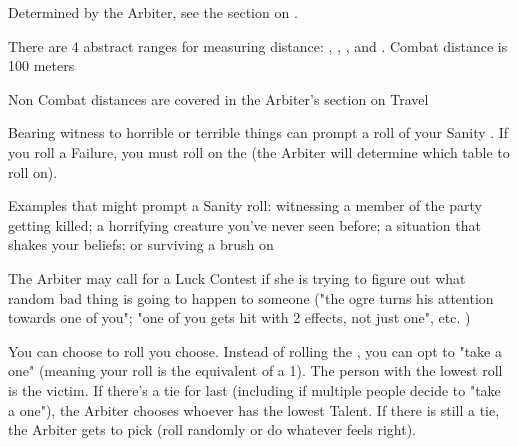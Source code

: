 {
Determined by the Arbiter, see the section on .

\cbreak


There are 4 abstract ranges for measuring distance:  , , , and  .  \MAX Combat distance is 100 meters




Non Combat distances are covered in the Arbiter's section on Travel





Bearing witness to horrible or terrible things can prompt a roll of your Sanity \UD.  If you roll a Failure, you must roll on the  (the Arbiter will determine which table to roll on). 

Examples that might prompt a Sanity roll:  witnessing a member of the party getting killed; a horrifying creature you've never seen before; a situation that shakes your beliefs; or surviving a brush on 



The Arbiter may call for a Luck Contest if she is trying to figure out what random bad thing is going to happen to someone ("the ogre turns his attention towards one of you"; "one of you gets hit with 2 effects, not just one", etc. )

You can choose to roll   \UD you choose.  Instead of rolling the \UD, you can opt to "take a one" (meaning your roll is the equivalent of a 1).  The person with the lowest roll is the victim. If there's a tie for last (including if multiple people decide to "take a one"), the Arbiter chooses whoever has the lowest Talent.  If there is still a tie, the Arbiter gets to pick (roll randomly or do whatever feels right).

}
